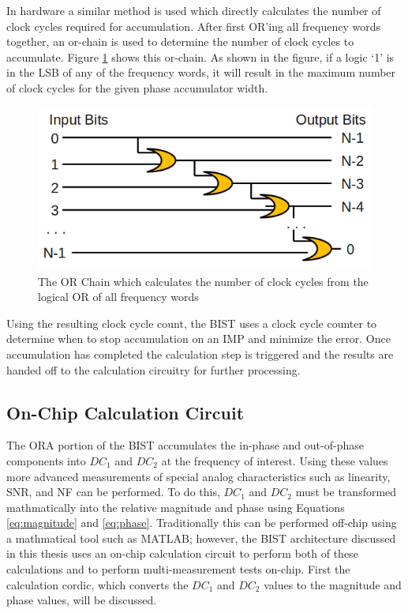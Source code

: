 \documentclass[12pt]{report}
\begin{document}
In hardware a similar method is used which directly calculates the number of clock cycles required for accumulation.  After first OR'ing all frequency words together, an or-chain is used to determine the number of clock cycles to accumulate.  Figure \ref{fig:or-chain} shows this or-chain.  As shown in the figure, if a logic `1' is in the LSB of any of the frequency words, it will result in the maximum number of clock cycles for the given phase accumulator width.  
\begin{figure}
	\begin{center}
		\includegraphics[scale=1]{images/or-chain}
	\end{center}
	\caption{The OR Chain which calculates the number of clock cycles from the logical OR of all frequency words}
	\label{fig:or-chain}
\end{figure}
Using the resulting clock cycle count, the BIST uses a clock cycle counter to determine when to stop accumulation on an IMP and minimize the error.  Once accumulation has completed the calculation step is triggered and the results are handed off to the calculation circuitry for further processing.

\subsection{On-Chip Calculation Circuit}
\label{sct:onchip}
The ORA portion of the BIST accumulates the in-phase and out-of-phase components into $DC_1$ and $DC_2$ at the frequency of interest.  Using these values more advanced measurements of special analog characteristics such as linearity, SNR, and NF can be performed.  To do this, $DC_1$ and $DC_2$ must be transformed mathmatically into the relative magnitude and phase using Equations \ref{eq:magnitude} and \ref{eq:phase}\cite{joey}.  Traditionally this can be performed off-chip using a mathmatical tool such as MATLAB; however, the BIST architecture discussed in this thesis uses an on-chip calculation circuit to perform both of these calculations and to perform multi-measurement tests on-chip\cite{joey}.  First the calculation cordic, which converts the $DC_1$ and $DC_2$ values to the magnitude and phase values, will be discussed.
\end{document}
